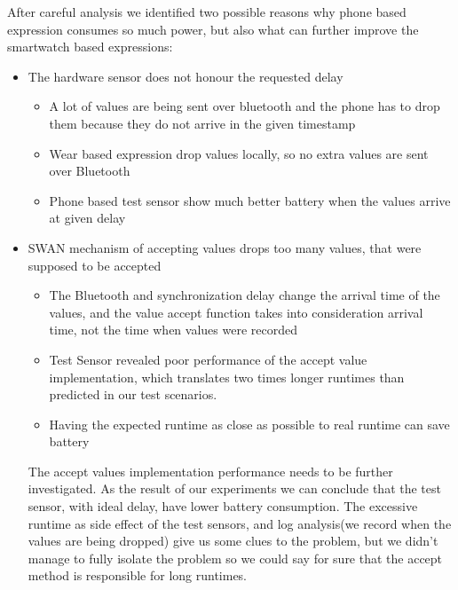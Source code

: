 After careful analysis we identified two possible reasons why phone based expression consumes so much power, but also what can further improve the smartwatch based expressions:
\begin{itemize}
 \item The hardware sensor does not honour the requested delay
 \begin{itemize}
  \item A lot of values are being sent over bluetooth and the phone has to drop them because they do not arrive in the given timestamp
  \item Wear based expression drop values locally, so no extra values are sent over Bluetooth
  \item Phone based test sensor show much better battery when the values arrive at given delay
 \end{itemize}
 \item SWAN mechanism of accepting values drops too many values, that were supposed to be accepted
 \begin{itemize}
  \item The Bluetooth and synchronization delay change the arrival time of the values, and the value accept function takes into consideration arrival time, not the time when values were recorded
  \item Test Sensor revealed poor performance of the accept value implementation, which translates two times longer runtimes than predicted in our test scenarios.
  \item Having the expected runtime as close as possible to real runtime can save battery
 \end{itemize}

 The accept values implementation performance needs to be further investigated.
 As the result of our experiments we can conclude that the test sensor, with ideal delay, have lower battery consumption.
 The excessive runtime as side effect of the test sensors, and log analysis(we record when the values are being dropped) give us some clues to the problem, but we didn't manage to fully isolate the
 problem so we could say for sure that the accept method is responsible for long runtimes.

\end{itemize}
